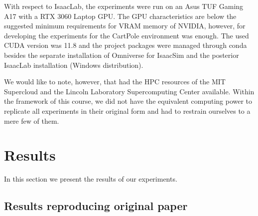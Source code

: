 \documentclass[10pt]{article} %
\begin{document}

With respect to IsaacLab, the experiments were run on an Asus TUF Gaming A17 with a RTX 3060 Laptop GPU. The GPU characteristics are below 
the suggested minimum requirements for VRAM memory of NVIDIA, however, for developing the experiments for the CartPole environment was enough.
The used CUDA version was 11.8 and the project packages were managed through conda besides the separate installation of Omniverse for IsaacSim and 
the posterior IsaacLab installation (Windows distribution). 

\noindent We would like to note, however, that \cite{rle-paper} had the HPC resources of the MIT Supercloud and the Lincoln Laboratory Supercomputing Center available. Within the framework of this course, we did not have the equivalent computing power to replicate all experiments in their original form and had to restrain ourselves to a mere few of them.

\hypertarget{sec4}{\section{Results}}

\noindent In this section we present the results of our experiments.



\subsection{Results reproducing original paper}
\end{document}
